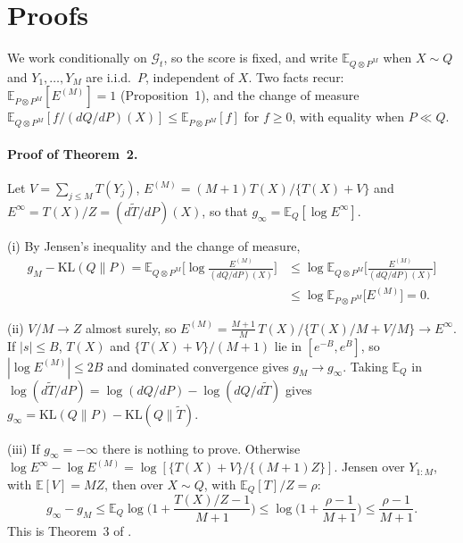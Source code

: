 \documentclass[11pt]{article}
\newcommand{\E}{\mathbb{E}}
\newcommand{\KL}{\mathrm{KL}}
\newcommand{\G}{\mathcal{G}}
\theoremstyle{remark}
\begin{document}
\section{Proofs}\label{app:proofs}

We work conditionally on $\G_t$, so the score is fixed, and write
$\E_{Q\otimes P^M}$ when $X \sim Q$ and $Y_1, \ldots, Y_M$ are i.i.d.\ $P$,
independent of $X$. Two facts recur: $\E_{P\otimes P^M}[E^{(M)}] = 1$
(Proposition~1), and the change of measure
$\E_{Q\otimes P^M}[f/(dQ/dP)(X)] \le \E_{P\otimes P^M}[f]$ for $f \ge 0$, with
equality when $P \ll Q$.

\paragraph{Proof of Theorem~2.}
Let $V = \sum_{j \le M} T(Y_j)$, $E^{(M)} = (M+1)T(X)/\{T(X)+V\}$ and
$E^\infty = T(X)/Z = (d\tilde T/dP)(X)$, so that $g_\infty = \E_Q[\log E^\infty]$.

(i) By Jensen's inequality and the change of measure,
\[
\begin{aligned}
g_M - \KL(Q\|P) = \E_{Q \otimes P^M}\Big[\log\frac{E^{(M)}}{(dQ/dP)(X)}\Big]
&\le \log \E_{Q \otimes P^M}\Big[\frac{E^{(M)}}{(dQ/dP)(X)}\Big] \\
&\le \log \E_{P \otimes P^M}\big[E^{(M)}\big] = 0 .
\end{aligned}
\]

(ii) $V/M \to Z$ almost surely, so
$E^{(M)} = \frac{M+1}{M}\,T(X)/\{T(X)/M + V/M\} \to E^\infty$. If $|s| \le B$,
$T(X)$ and $\{T(X)+V\}/(M+1)$ lie in $[e^{-B}, e^{B}]$, so
$|\log E^{(M)}| \le 2B$ and dominated convergence gives $g_M \to g_\infty$.
Taking $\E_Q$ in $\log(d\tilde T/dP) = \log(dQ/dP) - \log(dQ/d\tilde T)$ gives
$g_\infty = \KL(Q\|P) - \KL(Q\|\tilde T)$.

(iii) If $g_\infty = -\infty$ there is nothing to prove. Otherwise
$\log E^\infty - \log E^{(M)} = \log[\{T(X) + V\}/\{(M+1)Z\}]$. Jensen over
$Y_{1:M}$, with $\E[V] = MZ$, then over $X \sim Q$, with $\E_Q[T]/Z = \rho$:
\[
g_\infty - g_M \le \E_Q\log\Big(1 + \frac{T(X)/Z - 1}{M+1}\Big)
\le \log\Big(1 + \frac{\rho - 1}{M+1}\Big) \le \frac{\rho-1}{M+1}.
\]
This is Theorem~3 of \citet{dombowsky2026besag}.
\end{document}
